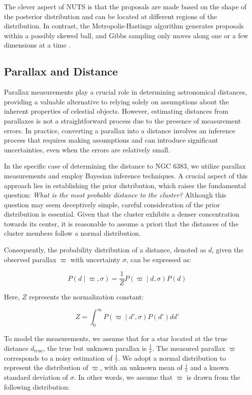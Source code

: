 \documentclass[baaa]{baaa}
\begin{document}
The clever aspect of NUTS is that the proposals are made based on the shape of the posterior distribution and can be located at different regions of the distribution. In contrast, the Metropolis-Hastings algorithm generates proposals within a possibly skewed ball, and Gibbs sampling only moves along one or a few dimensions at a time \citep{phan2019composable}.

\subsection{Parallax and Distance}

Parallax measurements play a crucial role in determining astronomical distances, providing a valuable alternative to relying solely on assumptions about the inherent properties of celestial objects. However, estimating distances from parallaxes is not a straightforward process due to the presence of measurement errors. In practice, converting a parallax into a distance involves an inference process that requires making assumptions and can introduce significant uncertainties, even when the errors are relatively small.

In the specific case of determining the distance to NGC 6383, we utilize parallax measurements and employ Bayesian inference techniques. A crucial aspect of this approach lies in establishing the prior distribution, which raises the fundamental question: \textit{What is the most probable distance to the cluster?} Although this question may seem deceptively simple, careful consideration of the prior distribution is essential. Given that the cluster exhibits a denser concentration towards its center, it is reasonable to assume a priori that the distances of the cluster members follow a normal distribution.

Consequently, the probability distribution of a distance, denoted as $d$, given the observed parallax $\varpi$ with uncertainty $\sigma$, can be expressed as:

\begin{equation*}
P(d\mid \varpi,\sigma) = \frac{1}{Z}P(\varpi \mid d,\sigma)P(d)
\end{equation*}

Here, $Z$ represents the normalization constant:

\begin{equation*}
Z = \int_{0}^\infty P(\varpi \mid d',\sigma)P(d') dd'
\end{equation*}

To model the measurements, we assume that for a star located at the true distance $d_{\text{true}}$, the true but unknown parallax is $\frac{1}{r}$. The measured parallax $\varpi$ corresponds to a noisy estimation of $\frac{1}{r}$. We adopt a normal distribution to represent the distribution of $\varpi$, with an unknown mean of $\frac{1}{r}$ and a known standard deviation of $\sigma$. In other words, we assume that $\varpi$ is drawn from the following distribution:
\end{document}
